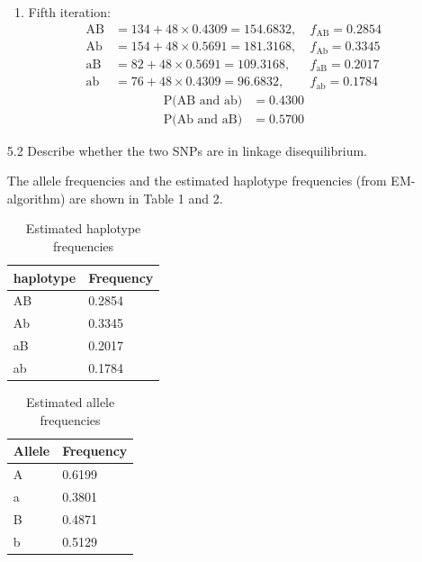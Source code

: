 \documentclass{article}
\begin{document}
\begin{itemize}
\begin{enumerate}
\item Fifth iteration:
    \begin{align*}
        \text{AB} &= 134 + 48\times 0.4309 = 154.6832, &~ f_{\text{AB}} = 0.2854\\
        \text{Ab} &= 154 + 48\times 0.5691 = 181.3168, &~ f_{\text{Ab}} = 0.3345\\
        \text{aB} &= 82  + 48\times 0.5691 = 109.3168, &~ f_{\text{aB}} = 0.2017\\
        \text{ab} &= 76  + 48\times 0.4309 =  96.6832, &~ f_{\text{ab}} = 0.1784 
    \end{align*}
    \begin{align*}
        \text{P(AB and ab)} &= 0.4300\\
        \text{P(Ab and aB)} &= 0.5700
    \end{align*}
\end{enumerate}

\item[5.2] Describe whether the two SNPs are in linkage disequilibrium.

The allele frequencies and the estimated haplotype frequencies (from EM-algorithm) are shown in Table 1 and 2.
\begin{table}[h!]
    \centering
    \begin{tabular}{|l|l|}
    \hline
    haplotype & Frequency \\ \hline
    AB        & 0.2854    \\ \hline
    Ab        & 0.3345    \\ \hline
    aB        & 0.2017    \\ \hline
    ab        & 0.1784    \\ \hline
    \end{tabular}
    \caption{Estimated haplotype frequencies}
\end{table}

\begin{table}[h!]
    \centering
    \begin{tabular}{|l|l|}
    \hline
    Allele & Frequency \\ \hline
    A      & 0.6199    \\ \hline
    a      & 0.3801    \\ \hline
    B      & 0.4871    \\ \hline
    b      & 0.5129    \\ \hline
    \end{tabular}
    \caption{Estimated allele frequencies}
\end{table}


\end{itemize}
\end{document}
